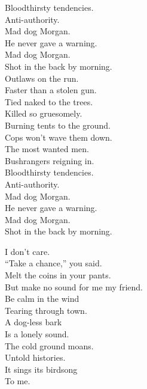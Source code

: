 Bloodthirsty tendencies. \\
Anti-authority. \\

Mad dog Morgan. \\
He never gave a warning. \\
Mad dog Morgan. \\
Shot in the back by morning. \\

Outlaws on the run. \\
Faster than a stolen gun. \\
Tied naked to the trees. \\
Killed so gruesomely. \\
Burning tents to the ground. \\
Cops won't wave them down. \\
The most wanted men. \\
Bushrangers reigning in. \\

Bloodthirsty tendencies. \\
Anti-authority. \\

Mad dog Morgan. \\
He never gave a warning. \\
Mad dog Morgan. \\
Shot in the back by morning. \\





I don't care. \\
``Take a chance,'' you said. \\
Melt the coins in your pants. \\
But make no sound for me my friend. \\

Be calm in the wind \\
Tearing through town. \\
A dog-less bark \\
Is a lonely sound. \\

The cold ground moans. \\
Untold histories. \\
It sings its birdsong \\
To me. \\

